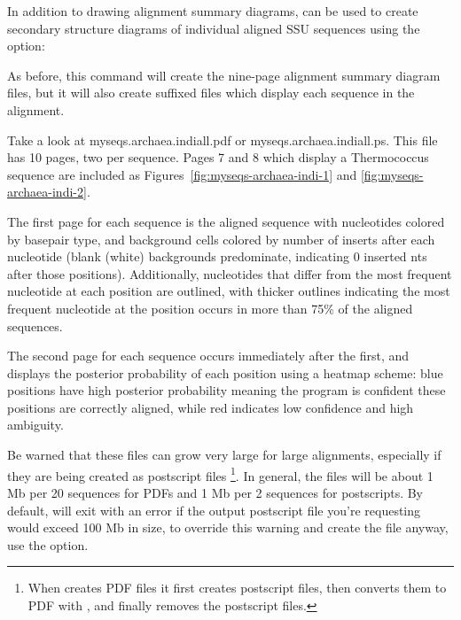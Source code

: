 In addition to drawing alignment summary diagrams,  can
be used to create secondary structure diagrams of individual aligned
SSU sequences using the  option:


As before, this command will create the nine-page alignment summary
diagram files, but it will also create  suffixed
files which display each sequence in the alignment. 

Take a look at {myseqs.archaea.indiall.pdf} or
{myseqs.archaea.indiall.ps}. This file has 10 pages, two per
sequence. Pages 7 and 8 which display a Thermococcus sequence are
included as Figures~\ref{fig:myseqs-archaea-indi-1} and
\ref{fig:myseqs-archaea-indi-2}.

The first page for each sequence is the aligned sequence with
nucleotides colored by basepair type, and background cells colored by
number of inserts after each nucleotide (blank (white) backgrounds
predominate, indicating 0 inserted nts after those
positions). Additionally, nucleotides that differ from the most
frequent nucleotide at each position are outlined, with thicker
outlines indicating the most frequent nucleotide at the position
occurs in more than 75\% of the aligned sequences.

The second page for each sequence occurs immediately after
the first, and displays the posterior probability of each position
using a heatmap scheme: blue positions have high posterior
probability meaning the program is confident these positions are
correctly aligned, while red indicates low confidence and high
ambiguity. 

Be warned that these files can grow very large for large alignments,
especially if they are being created as postscript
files \footnote{When  creates PDF files it first
  creates postscript files, then converts them to PDF with
  , and finally removes the postscript files.}. In
general, the files will be about 1 Mb per 20 sequences for PDFs and 1
Mb per 2 sequences for postscripts. By default,  will
exit with an error if the output postscript file you're requesting
would exceed 100 Mb in size, to override this warning and create the
file anyway, use the  option.

